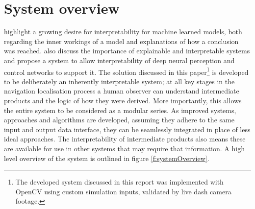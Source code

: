 \documentclass[]{aiaa-tc}%
\begin{document}
%

\section{System overview}
\citet{explainableAIStakeholders} highlight a growing desire for interpretability for machine learned models, both regarding the inner workings of a model and explanations of how a conclusion was reached. \citet{explainableCNNBookChapter} also discuss the importance of explainable and interpretable systems and propose a system to allow interpretability of deep neural perception and control networks to support it. The solution discussed in this paper\footnote{The developed system discussed in this report was implemented with OpenCV using custom simulation inputs, validated by live dash camera footage.} is developed to be deliberately an inherently interpretable system; at all key stages in the navigation localisation process a human observer can understand intermediate products and the logic of how they were derived.  More importantly, this allows the entire system to be considered as a modular series. As improved systems, approaches and algorithms are developed, assuming they adhere to the same input and output data interface, they can be seamlessly integrated in place of less ideal approaches. The interpretability of intermediate products also means these are available for use in other systems that may require that information. A high level overview of the system is outlined in figure \ref{f:systemOverview}.
\end{document}
